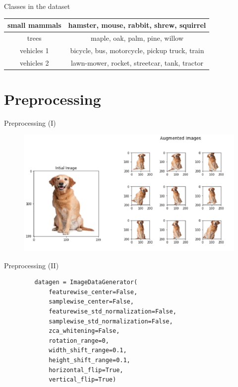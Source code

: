 \documentclass{beamer}
\begin{document}
\begin{frame}[fragile]{Classes in the dataset}
\begin{table}
{\begin{tabular}{|c|c|}
    \hline
    small mammals                  & hamster, mouse, rabbit, shrew, squirrel               \\
    \hline
    trees                          & maple, oak, palm, pine, willow                        \\
    \hline
    vehicles 1                     & bicycle, bus, motorcycle, pickup truck, train         \\
    \hline
    vehicles 2                     & lawn-mower, rocket, streetcar, tank, tractor          \\
    \hline
   \end{tabular}
  }
 \end{table}

\end{frame}


\section{Preprocessing}

\begin{frame}[fragile]{Preprocessing (I)}
 \begin{figure}[H]
  \centering
  \includegraphics[scale=0.45]{img/image_augmentation.png}
 \end{figure}
\end{frame}

\begin{frame}[fragile]{Preprocessing (II)}
 \begin{figure}[H]
  \centering
  \begin{verbatim}
   datagen = ImageDataGenerator(
       featurewise_center=False,
       samplewise_center=False,
       featurewise_std_normalization=False,
       samplewise_std_normalization=False,
       zca_whitening=False,
       rotation_range=0,
       width_shift_range=0.1,
       height_shift_range=0.1,
       horizontal_flip=True,
       vertical_flip=True)
   \end{verbatim}
 \end{figure}
\end{frame}
\end{document}
